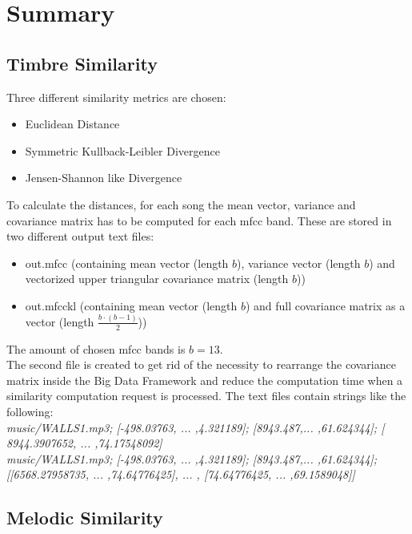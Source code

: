 \section{Summary}

\subsection{Timbre Similarity}

Three different similarity metrics are chosen: 
\begin{itemize}
	\item Euclidean Distance
	\item Symmetric Kullback-Leibler Divergence
	\item Jensen-Shannon like Divergence
\end{itemize}
To calculate the distances, for each song the mean vector, variance and covariance matrix has to be computed for each mfcc band. These are stored in two different output text files: 
\begin{itemize}
	\item out.mfcc (containing mean vector (length $b$), variance vector (length $b$) and vectorized upper triangular covariance matrix (length $b$))
	\item out.mfcckl (containing mean vector (length $b$) and full covariance matrix as a vector (length $\frac{b \cdot (b-1)}{2}$))
\end{itemize}
The amount of chosen mfcc bands is $b = 13$.\\
The second file is created to get rid of the necessity to rearrange the covariance matrix inside the Big Data Framework and reduce the computation time when a similarity computation request is processed.
The text files contain strings like the following:\\
\textit{music/WALLS1.mp3; [-498.03763,  ... ,4.321189]; [8943.487,... ,61.624344]; [ 8944.3907652, ... ,74.17548092]}\\
\textit{music/WALLS1.mp3; [-498.03763,  ... ,4.321189]; [8943.487,... ,61.624344]; [[6568.27958735, ... ,74.64776425], ... , [74.64776425, ... ,69.1589048]]}

\subsection{Melodic Similarity}

